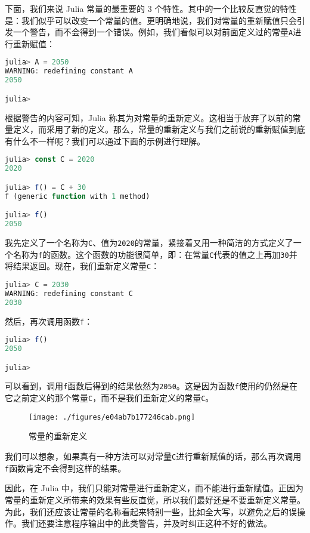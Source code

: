 下面，我们来说 Julia 常量的最重要的 3 个特性。其中的一个比较反直觉的特性是：我们似乎可以改变一个常量的值。更明确地说，我们对常量的重新赋值只会引发一个警告，而不会得到一个错误。例如，我们看似可以对前面定义过的常量\verb`A`进行重新赋值：

\begin{lstlisting}[language=julia]
julia> A = 2050
WARNING: redefining constant A
2050

julia> 
\end{lstlisting}

根据警告的内容可知，Julia 称其为对常量的重新定义。这相当于放弃了以前的常量定义，而采用了新的定义。那么，常量的重新定义与我们之前说的重新赋值到底有什么不一样呢？我们可以通过下面的示例进行理解。

\begin{lstlisting}[language=julia]
julia> const C = 2020 
2020

julia> f() = C + 30
f (generic function with 1 method)

julia> f()
2050
\end{lstlisting}

我先定义了一个名称为\verb`C`、值为\verb`2020`的常量，紧接着又用一种简洁的方式定义了一个名称为\verb`f`的函数。这个函数的功能很简单，即：在常量\verb`C`代表的值之上再加\verb`30`并将结果返回。现在，我们重新定义常量\verb`C`：

\begin{lstlisting}[language=julia]
julia> C = 2030
WARNING: redefining constant C
2030
\end{lstlisting}

然后，再次调用函数\verb`f`：

\begin{lstlisting}[language=julia]
julia> f()
2050

julia> 
\end{lstlisting}

可以看到，调用\verb`f`函数后得到的结果依然为\verb`2050`。这是因为函数\verb`f`使用的仍然是在它之前定义的那个常量\verb`C`，而不是我们重新定义的常量\verb`C`。

\begin{figure}[ht]
\centering
\texttt{[image: ./figures/e04ab7b177246cab.png]}
\caption{常量的重新定义} \label{fig_JuC3S4_1}
\end{figure}

我们可以想象，如果真有一种方法可以对常量\verb`C`进行重新赋值的话，那么再次调用\verb`f`函数肯定不会得到这样的结果。

因此，在 Julia 中，我们只能对常量进行重新定义，而不能进行重新赋值。正因为常量的重新定义所带来的效果有些反直觉，所以我们最好还是不要重新定义常量。为此，我们还应该让常量的名称看起来特别一些，比如全大写，以避免之后的误操作。我们还要注意程序输出中的此类警告，并及时纠正这种不好的做法。

